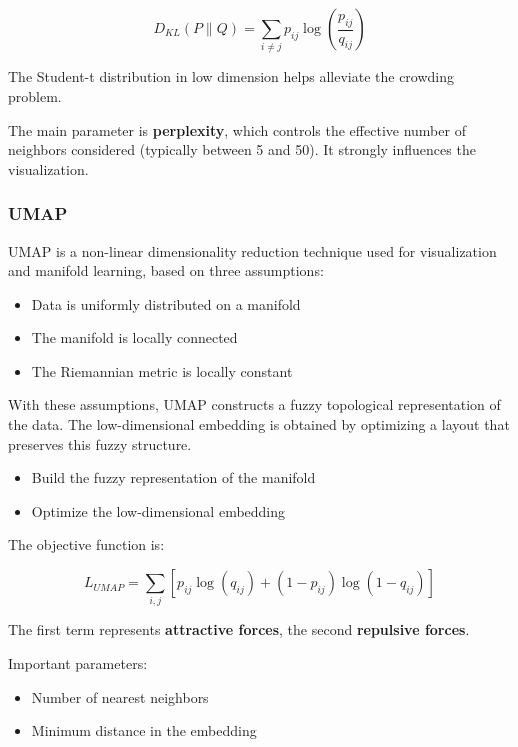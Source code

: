 \[
D_{KL}(P \parallel Q) = \sum_{i \ne j} p_{ij} \log\left(\frac{p_{ij}}{q_{ij}}\right)
\]

The Student-t distribution in low dimension helps alleviate the crowding problem.

\vspace{10pt}

The main parameter is \textbf{perplexity}, which controls the effective number of neighbors considered (typically between 5 and 50). It strongly influences the visualization.

\subsubsection{UMAP}

UMAP is a non-linear dimensionality reduction technique used for visualization and manifold learning, based on three assumptions:

\begin{itemize}
    \item Data is uniformly distributed on a manifold
    \item The manifold is locally connected
    \item The Riemannian metric is locally constant
\end{itemize}

With these assumptions, UMAP constructs a fuzzy topological representation of the data. The low-dimensional embedding is obtained by optimizing a layout that preserves this fuzzy structure.

\begin{itemize}
    \item Build the fuzzy representation of the manifold
    \item Optimize the low-dimensional embedding
\end{itemize}

The objective function is:

\[
L_{UMAP} = \sum_{i,j} \left[ p_{ij}\log(q_{ij}) + (1 - p_{ij})\log(1 - q_{ij}) \right]
\]

The first term represents \textbf{attractive forces}, the second \textbf{repulsive forces}.

Important parameters:
\begin{itemize}
    \item Number of nearest neighbors
    \item Minimum distance in the embedding
\end{itemize}